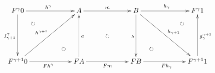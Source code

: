 \documentclass[12pt]{article}
\begin{document}
\pagestyle{empty}

\begin{align*}
  \vcenter{
    \xymatrix@=60pt{
      F^\gamma 0
      \ar@{->}[d]_{f^\gamma_{\gamma + 1}}
      \ar@{->}[r]^{h^\gamma}
      \ar@{{}{ }{}}[rd]|(0.25){\circlearrowright}
      \ar@{{}{ }{}}[rd]|(0.75){\circlearrowright}
      &
      A
      \ar@{->}[r]^{m}
      \ar@{{}{ }{}}[rd]|{\circlearrowright}
      &
      B
      \ar@{->}[r]^{h_\gamma}
      \ar@{->}[d]_{b}
      \ar@{->}[rd]^{h_{\gamma + 1}}
      &
      F^\gamma 1
      \\
      F^{\gamma + 1} 0
      \ar@{->}[ru]^{h^{\gamma + 1}}
      \ar@{->}[r]_{F h^\gamma}
      &
      F A
      \ar@{->}[r]_{F m}
      \ar@{->}[u]_{a}
      &
      F B
      \ar@{->}[r]_{F h_\gamma}
      \ar@{{}{ }{}}[ru]|(0.25){\circlearrowright}
      \ar@{{}{ }{}}[ru]|(0.75){\circlearrowright}
      &
      F^{\gamma + 1} 1
      \ar@{->}[u]_{g^{\gamma + 1}_\gamma}
    }
  }
\end{align*}
\end{document}
